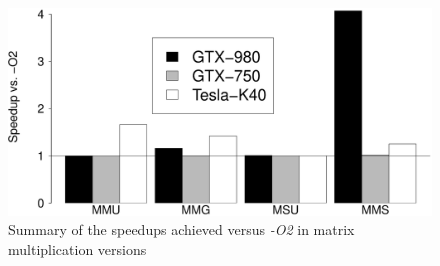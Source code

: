 \begin{figure}[htpb]
	\centering
    \includegraphics[scale=.2]{images/MatrixSummary.eps}
    \caption{Summary of the speedups achieved versus \emph{-O2} in matrix multiplication versions}
    \label{fig:autotuning}
\end{figure}